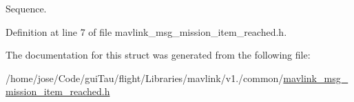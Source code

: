 Sequence. 



Definition at line 7 of file mavlink\-\_\-msg\-\_\-mission\-\_\-item\-\_\-reached.\-h.



The documentation for this struct was generated from the following file\-:\begin{DoxyCompactItemize}
\item 
/home/jose/\-Code/gui\-Tau/flight/\-Libraries/mavlink/v1./common/\hyperlink{mavlink__msg__mission__item__reached_8h}{mavlink\-\_\-msg\-\_\-mission\-\_\-item\-\_\-reached.\-h}\end{DoxyCompactItemize}
